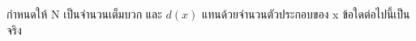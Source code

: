 ﻿%
\question กำหนดให้ N เป็นจำนวนเต็มบวก และ $d(x)$ แทนด้วยจำนวนตัวประกอบของ x ข้อใดต่อไปนี้เป็นจริง
\newline
{}
